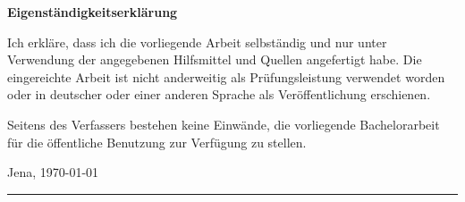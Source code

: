 \documentclass[crop=false]{standalone}
\begin{document}
  \thispagestyle{empty}

  \noindent
  {\Large \bfseries Eigenständigkeitserklärung}
  \vspace{\baselineskip}

  \noindent
  Ich erkläre, dass ich die vorliegende Arbeit selbständig und nur unter Verwendung der angegebenen
  Hilfsmittel und Quellen angefertigt habe. Die eingereichte Arbeit ist nicht anderweitig als Prüfungsleistung
  verwendet worden oder in deutscher oder einer anderen Sprache als Veröffentlichung erschienen.

  \noindent
  Seitens des Verfassers bestehen keine Einwände, die vorliegende
  Bachelorarbeit für die öffentliche Benutzung zur Verfügung zu stellen.

  \vspace{2\baselineskip}

  \noindent
  Jena, \today

  \noindent
  \hfill\rule{0.4\textwidth}{0.5pt}
  \vspace{0.1pt} \\
  {\\}
\end{document}
